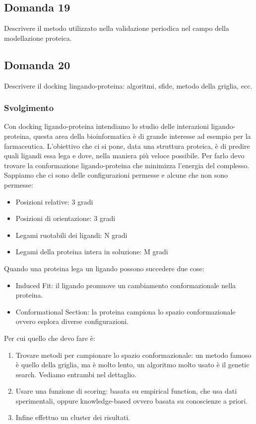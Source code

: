 \documentclass{article}
\begin{document}
\subsection*{Domanda 19}
Descrivere il metodo utilizzato nella validazione periodica nel campo della modellazione proteica.

\subsection*{Domanda 20}
Descrivere il docking lingando-proteina: algoritmi, sfide, metodo della griglia, ecc.
\subsubsection*{Svolgimento}
Con docking ligando-proteina intendiamo lo studio delle interazioni ligando-proteina, questa area della bioinformatica è di grande interesse ad esempio per la farmaceutica. L'obiettivo che ci si pone, data una struttura proteica,
è di predire quali ligandi essa lega e dove, nella maniera più veloce possibile. Per farlo devo trovare la conformazione ligando-proteina che minimizza l'energia del complesso.\\
Sappiamo che ci sono delle configurazioni permesse e alcune che non sono permesse:
\begin{itemize}
    \item Posizioni relative: 3 gradi
    \item Posizioni di orientazione: 3 gradi 
    \item Legami ruotabili dei ligandi: N gradi 
    \item Legami della proteina intera in soluzione: M gradi
\end{itemize}
Quando una proteina lega un ligando possono succedere due cose:
\begin{itemize}
    \item Induced Fit: il ligando promuove un cambiamento conformazionale nella proteina. 
    \item Conformational Section: la proteina campiona lo spazio conformazionale ovvero esplora diverse configurazioni. 
\end{itemize}
Per cui quello che devo fare è:
\begin{enumerate}
    \item Trovare metodi per campionare lo spazio conformazionale: un metodo famoso è quello della griglia, ma è molto lento, un algoritmo molto usato è il genetic search. Vediamo entrambi nel dettaglio.
    \item Usare una funzione di scoring: basata su empirical function, che usa dati sperimentali, oppure knowledge-based ovvero basata su conoscienze a priori.
    \item Infine effettuo un cluster dei risultati.
\end{enumerate}
\end{document}
